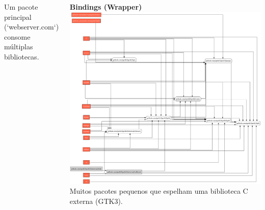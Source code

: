 \documentclass{beamer}
\begin{document}
\begin{frame}
\begin{columns}[T]
\begin{column}{0.32\textwidth}
      \tiny
      Um pacote principal (`webserver.com`) consome múltiplas bibliotecas.
    \end{column}
    \begin{column}{0.32\textwidth}
      \centering
      \textbf{Bindings (Wrapper)}\\
      \includegraphics[width=\textwidth]{images/gotk3.png}
      \tiny
      Muitos pacotes pequenos que espelham uma biblioteca C externa (GTK3).
    \end{column}
  \end{columns}
\end{frame}
\end{document}
